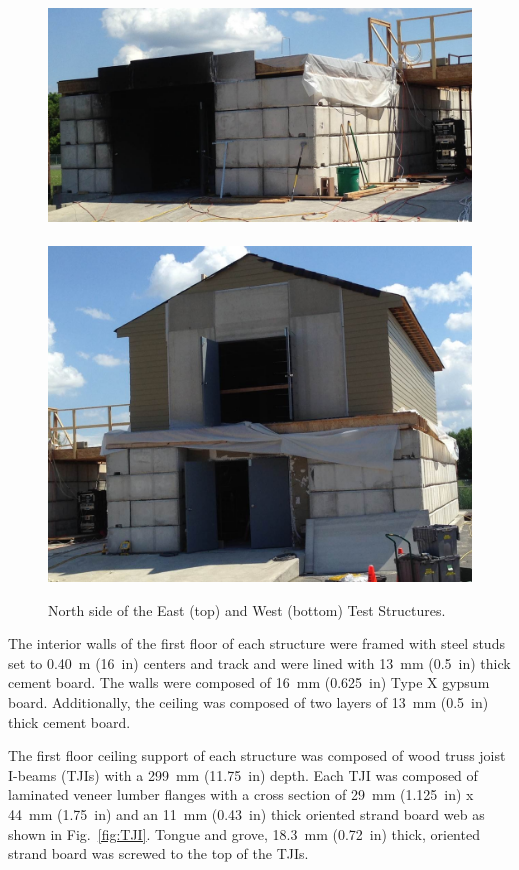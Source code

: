 \documentclass[12pt,oneside]{book}
\begin{document}
\begin{figure}[!ht]
	\includegraphics[width=5.25in]{../Figures/Pictures/east_structure}
	\\~\\
	\includegraphics[width=5.25in]{../Figures/Pictures/west_structure}
	\caption[North side of the East and West Structures.]{North side of the East (top) and West (bottom) Test Structures.}
	\label{fig:struct_pics}
\end{figure}

The interior walls of the first floor of each structure were framed with steel studs set to 0.40~m (16~in) centers and track and were lined with 13~mm (0.5~in) thick cement board. The walls were composed of 16~mm (0.625~in) Type X gypsum board. Additionally, the ceiling was composed of two layers of 13~mm (0.5~in) thick cement board.
\FloatBarrier

The first floor ceiling support of each structure was composed of wood truss joist I-beams (TJIs) with a 299~mm (11.75~in) depth. Each TJI was composed of laminated veneer lumber flanges with a cross section of 29~mm (1.125~in) x 44~mm (1.75~in) and an 11~mm (0.43~in) thick oriented strand board web as shown in Fig.~\ref{fig:TJI}. Tongue and grove, 18.3~mm (0.72~in) thick, oriented strand board was screwed to the top of the TJIs.
\end{document}
